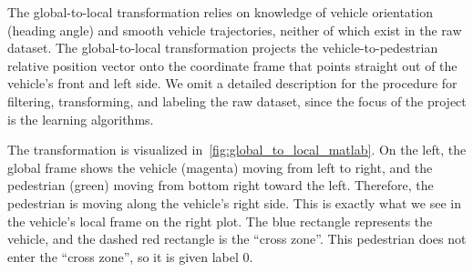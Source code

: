 The global-to-local transformation relies on knowledge of vehicle orientation (heading angle) and smooth vehicle trajectories, neither of which exist in the raw dataset.
The global-to-local transformation projects the vehicle-to-pedestrian relative position vector onto the coordinate frame that points straight out of the vehicle's front and left side.
We omit a detailed description for the procedure for filtering, transforming, and labeling the raw dataset, since the focus of the project is the learning algorithms.

The transformation is visualized in~\cref{fig:global_to_local_matlab}.
On the left, the global frame shows the vehicle (magenta) moving from left to right, and the pedestrian (green) moving from bottom right toward the left.
Therefore, the pedestrian is moving along the vehicle's right side.
This is exactly what we see in the vehicle's local frame on the right plot.
The blue rectangle represents the vehicle, and the dashed red rectangle is the ``cross zone''.
This pedestrian does not enter the ``cross zone'', so it is given label 0.


